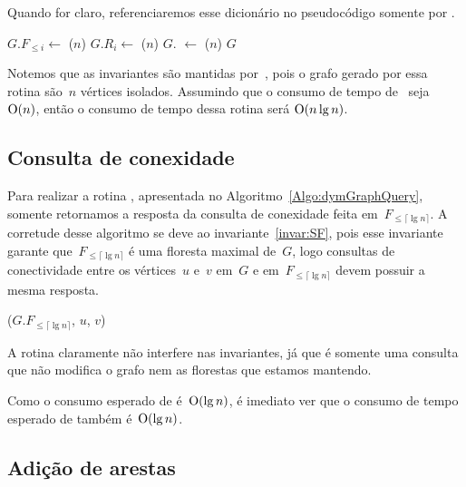 Quando for claro, referenciaremos esse dicionário no pseudocódigo somente por \nivel.

\begin{algorithm}
\caption{\dymGraphCreate($n$)}
\label{Algo:dymGraphCreate}
\begin{algorithmic}[1]
\State $G.F_{\leqslant i} \gets$ \dymForestCreate($n$)
\State $G.R_i \gets$ \graphCreate($n$)
\EndFor
\State $G$.\nivel{} $\gets$ \hashCreate($n$)
\State \Return $G$ 
\end{algorithmic}
\end{algorithm}


Notemos que as invariantes são mantidas por~\dymGraphCreate{}, pois o grafo gerado por essa rotina são~$n$ vértices isolados. Assumindo que o consumo de tempo de~\graphCreate{} seja~$\mathrm{O}(n)$, então o consumo de tempo dessa rotina será $\mathrm{O}(n\lg n)$.

\subsection{Consulta de conexidade}

Para realizar a rotina \dymGraphQuery{}, apresentada no Algoritmo~\ref{Algo:dymGraphQuery}, somente retornamos a resposta da consulta de conexidade feita em~$F_{\leqslant \lceil \lg n \rceil}$.
A corretude desse algoritmo se deve ao invariante~\ref{invar:SF}, pois esse invariante garante que~$F_{\leqslant\lceil \lg n \rceil}$ é uma floresta maximal de~$G$, logo consultas de conectividade entre os vértices~$u$ e~$v$ em~$G$ e em~$F_{\leqslant\lceil \lg n \rceil}$ devem possuir a mesma resposta.

\begin{algorithm}
\caption{\dymGraphQuery($G$, $u$, $v$)}
\label{Algo:dymGraphQuery}
\begin{algorithmic}[1]
\State \Return \dymForestQuery($G$.$F_{\leqslant\lceil \lg n \rceil}$, $u$, $v$)
\end{algorithmic}
\end{algorithm}

A rotina \dymGraphQuery{} claramente não interfere nas invariantes, já que  é somente uma consulta que não modifica o grafo nem as florestas que estamos mantendo.

Como o consumo esperado de \dymForestQuery{} é~$\mathrm{O}(\lg n)$, é imediato ver que o consumo de tempo esperado de \dymGraphQuery{} também é~$\mathrm{O}(\lg n)$.

\subsection{Adição de arestas}

